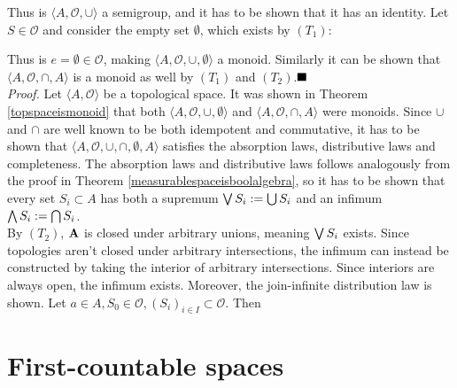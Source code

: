 Thus is $\langle A,\mathcal{O},\cup\rangle$ a semigroup, and it has to be shown that it has an identity. Let $S\in\mathcal{O}$ and consider the empty set $\emptyset$, which exists by $(T_1)$:

Thus is $e=\emptyset\in\mathcal{O}$, making $\langle A,\mathcal{O},\cup,\emptyset\rangle$ a monoid. Similarly it can be shown that $\langle A,\mathcal{O},\cap,A\rangle$ is a monoid as well by $(T_1)$ and $(T_2)$.$\qed$\\

\textit{Proof.}
Let $\langle A,\mathcal{O}\rangle$ be a topological space. It was shown in Theorem \ref{topspaceismonoid} that both $\langle A,\mathcal{O}, \cup, \emptyset\rangle$ and $\langle A,\mathcal{O},\cap,A\rangle$ were monoids. Since $\cup$ and $\cap$ are well known to be both idempotent and commutative, it has to be shown that $\langle A,\mathcal{O},\cup,\cap,\emptyset,A\rangle$ satisfies the absorption laws, distributive laws and completeness. The absorption laws and distributive laws follows analogously from the proof in Theorem \ref{measurablespaceisboolalgebra}, so it has to be shown that every set $S_i\subset A$ has both a supremum $\bigvee S_i:=\bigcup S_i$ and an infimum $\bigwedge S_i:=\bigcap S_i$.\\

By $(T_2)$, ${\bf A}$ is closed under arbitrary unions, meaning $\bigvee S_i$ exists. Since topologies aren't closed under arbitrary intersections, the infimum can instead be constructed by taking the interior of arbitrary intersections. Since interiors are always open, the infimum exists. Moreover, the join-infinite distribution law is shown. Let $a\in A,S_0\in\mathcal{O},(S_i)_{i\in I}\subset\mathcal{O}$. Then

\section{First-countable spaces}

